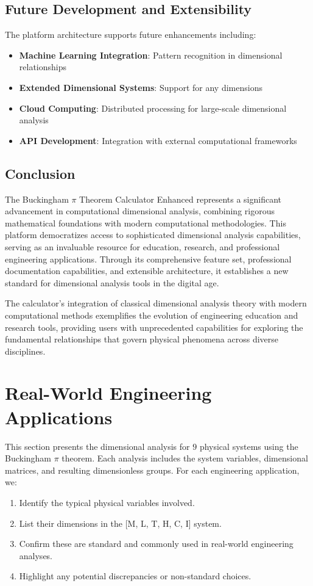 \documentclass[
	11pt, %
	fleqn, %
	a4paper, %
]{LegrandOrangeBook}
\begin{document}
\subsection{Future Development and Extensibility}
The platform architecture supports future enhancements including:
\begin{itemize}
    \item \textbf{Machine Learning Integration}: Pattern recognition in dimensional relationships
    \item \textbf{Extended Dimensional Systems}: Support for any dimensions
    \item \textbf{Cloud Computing}: Distributed processing for large-scale dimensional analysis
    \item \textbf{API Development}: Integration with external computational frameworks
\end{itemize}

\subsection{Conclusion}
The Buckingham $\pi$ Theorem Calculator Enhanced represents a significant advancement in computational dimensional analysis, combining rigorous mathematical foundations with modern computational methodologies. This platform democratizes access to sophisticated dimensional analysis capabilities, serving as an invaluable resource for education, research, and professional engineering applications. Through its comprehensive feature set, professional documentation capabilities, and extensible architecture, it establishes a new standard for dimensional analysis tools in the digital age.

The calculator's integration of classical dimensional analysis theory with modern computational methods exemplifies the evolution of engineering education and research tools, providing users with unprecedented capabilities for exploring the fundamental relationships that govern physical phenomena across diverse disciplines.


\section{ Real-World Engineering Applications}
        This section presents the dimensional analysis for $9$ physical systems using the Buckingham $\pi$ theorem. Each analysis includes the system variables, dimensional matrices, and resulting dimensionless groups.
        For each engineering application, we:
\begin{enumerate}
    \item Identify the typical physical variables involved.
    \item List their dimensions in the [M, L, T, H, C, I] system.
    \item Confirm these are standard and commonly used in real-world engineering analyses.
    \item Highlight any potential discrepancies or non-standard choices.
\end{enumerate}
\end{document}
